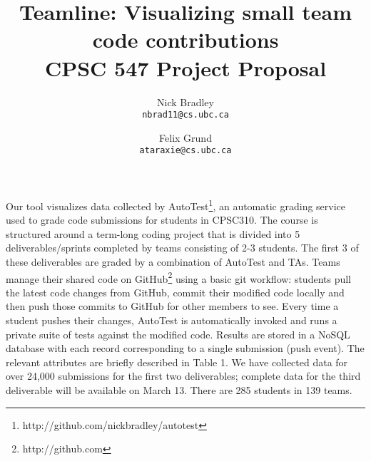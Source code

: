 \documentclass[preprint,journal]{vgtc}       %
\title{Teamline: Visualizing small team code contributions \\ \large CPSC 547 Project Proposal}
\author{
  Nick Bradley\\   \texttt{nbrad11@cs.ubc.ca}
  \and
  Felix Grund\\    \texttt{ataraxie@cs.ubc.ca}
}
\begin{document}


\maketitle


Our tool visualizes data collected by AutoTest\footnote{http://github.com/nickbradley/autotest},
an automatic grading service used to grade code submissions for students in
CPSC310. The course is structured around a term-long coding project that is
divided into 5 deliverables/sprints completed by teams consisting of 2-3 students.
The first 3 of these deliverables are graded by a combination of AutoTest and TAs.
Teams manage their shared code on GitHub\footnote{http://github.com}
using a basic git workflow: students pull the latest code changes from GitHub,
commit their modified code locally and then push those commits to GitHub for
other members to see. Every time a student pushes their changes, AutoTest is
automatically invoked and runs a private suite of tests against the modified
code. Results are stored in a NoSQL database with each record corresponding to a
single submission (push event). The relevant attributes are briefly described in
Table 1. We have collected data for over 24,000 submissions for the first two
deliverables; complete data for the third deliverable will be available on March
13. There are 285 students in 139 teams.
\end{document}

